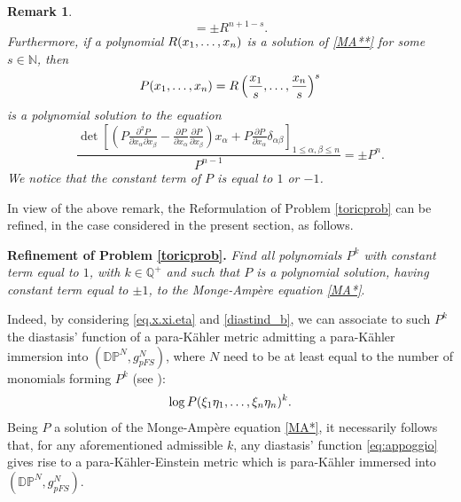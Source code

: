 \documentclass[11pt, reqno]{amsart}
\newtheorem{rem}[theor]{Remark}
\newcommand{\Q}{\mathds{Q}}
\newcommand{\DP}{\mathds{D}\mathds{P}}
\newcommand{\N}{\mathds{N}}
\newcommand{\KE }{K\"{a}hler-Einstein }
\newcommand{\pk }{para-K\"{a}hler }
\begin{document}
\begin{rem}
\begin{equation}
=\pm R^{n+1-s}.
\end{equation}
Furthermore, if a polynomial $R(x_1,\mathellipsis,x_n)$ is a solution of \eqref{MA**} for some $s\in\N$, then 
$$
P(x_1,\mathellipsis,x_n)=R\left(\frac{x_1}{s},\mathellipsis,\frac{x_n}{s}\right)^{s}
$$ 
is a polynomial solution to the equation 
\begin{equation}\label{MA*}
\frac{\det\left[\left(P \frac{\partial^2 P}{\partial{x_\alpha}\partial{x_\beta}}-\frac{\partial P}{\partial{x_\alpha}}\frac{\partial P}{\partial{x_\beta}}\right)x_\alpha+P\frac{\partial P}{\partial{x_\alpha}} \delta_{\alpha\beta}\right]_{1\leq\alpha,\beta\leq n}}{P^{n-1}}=\pm P^{n}.
\end{equation} 
We notice that the constant term of $P$ is equal to $1$ or $-1$.
\end{rem}
%
In view of the above remark,  the Reformulation of Problem \ref{toricprob} can be refined, in the case considered in the present section, as follows.

\medskip\noindent
\textbf{\large Refinement of Problem \ref{toricprob}.}\label{Refi}
\emph{Find all polynomials $P^k$ with constant term equal to $1$, with $k\in \Q^+$ and such that $P$ is a polynomial solution,  having constant term  equal to $\pm1$, to the  Monge-Ampère equation \eqref{MA*}}.

\medskip
Indeed, by considering \eqref{eq.x.xi.eta} and \eqref{diastind_b}, we can associate to such $P^k$ the diastasis' function of a \pk metric admitting a \pk  immersion into $(\DP^N,g_{pFS}^N)$, where $N$ need to be at least equal to the number of monomials forming $P^k$ (see \cite{MSpK}):
\begin{equation}\label{eq:appoggio}
\log P(\xi_1\eta_1,\mathellipsis,\xi_n\eta_n)^k. 
\end{equation}
Being $P$ a solution of the  Monge-Ampère equation \eqref{MA*}, 
it necessarily follows that, for any aforementioned admissible $k$,
any diastasis' function \eqref{eq:appoggio} gives rise to a para-\KE metric which is \pk  immersed into $(\DP^N,g_{pFS}^N)$.
\end{document}
